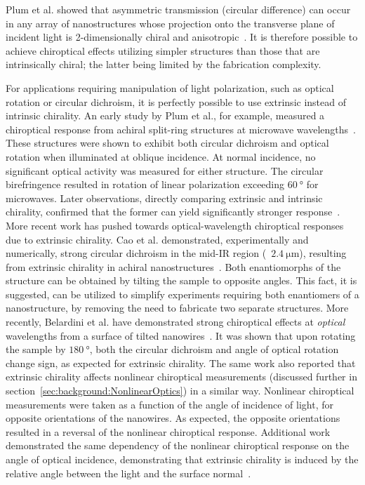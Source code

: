 Plum et al. showed that asymmetric transmission (circular difference) can occur in any array of nanostructures whose projection onto the transverse plane of incident light is 2-dimensionally chiral and anisotropic~\cite{Plum2011}. It is therefore possible to achieve chiroptical effects utilizing simpler structures than those that are intrinsically chiral; the latter being limited by the fabrication complexity. 

For applications requiring manipulation of light polarization, such as optical rotation or circular dichroism, it is perfectly possible to use extrinsic instead of intrinsic chirality. An early study by Plum et al., for example, measured a chiroptical response from achiral split-ring structures at microwave wavelengths~\cite{Plum2009c}. These structures were shown to exhibit both circular dichroism and optical rotation when illuminated at oblique incidence. At normal incidence, no significant optical activity was measured for either structure. The circular birefringence resulted in rotation of linear polarization exceeding $\SI{60}{\degree}$ for microwaves. Later observations, directly comparing extrinsic and intrinsic chirality, confirmed that the former can yield significantly stronger response~\cite{Maoz2012a}. 
More recent work has pushed towards optical-wavelength chiroptical responses due to extrinsic chirality.
Cao et al. demonstrated, experimentally and numerically, strong circular dichroism in the mid-IR region (~$\SI{2.4}{\micro\m}$), resulting from extrinsic chirality in achiral nanostructures~\cite{Cao2014}. Both enantiomorphs of the structure can be obtained by tilting the sample to opposite angles. This fact, it is suggested, can be utilized to simplify experiments requiring both enantiomers of a nanostructure, by removing the need to fabricate two separate structures.
More recently, Belardini et al. have demonstrated strong chiroptical effects at \textit{optical} wavelengths from a surface of tilted nanowires~\cite{Belardini2016}. It was shown that upon rotating the sample by $\SI{180}{\degree}$, both the circular dichroism and angle of optical rotation change sign, as expected for extrinsic chirality. 
The same work also reported that extrinsic chirality affects nonlinear chiroptical measurements (discussed further in section~\ref{sec:background:NonlinearOptics}) in a similar way. Nonlinear chiroptical measurements were taken as a function of the angle of incidence of light, for opposite orientations of the nanowires. As expected, the opposite orientations resulted in a reversal of the nonlinear chiroptical response. Additional work demonstrated the same dependency of the nonlinear chiroptical response on the angle of optical incidence, demonstrating that extrinsic chirality is induced by the relative angle between the light and the surface normal~\cite{Belardini2015}.

